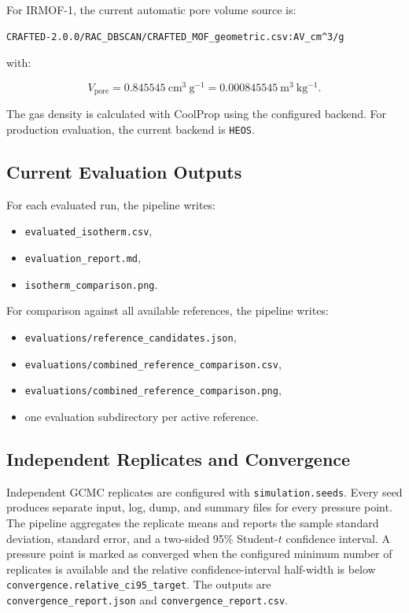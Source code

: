 For IRMOF-1, the current automatic pore volume source is:

\begin{lstlisting}
CRAFTED-2.0.0/RAC_DBSCAN/CRAFTED_MOF_geometric.csv:AV_cm^3/g
\end{lstlisting}

with:

\begin{equation}
    V_{\mathrm{pore}} = 0.845545~\mathrm{cm^3~g^{-1}}
    = 0.000845545~\mathrm{m^3~kg^{-1}}.
\end{equation}

The gas density is calculated with CoolProp using the configured backend.
For production evaluation, the current backend is \texttt{HEOS}.

\subsection{Current Evaluation Outputs}

For each evaluated run, the pipeline writes:

\begin{itemize}
    \item \texttt{evaluated\_isotherm.csv},
    \item \texttt{evaluation\_report.md},
    \item \texttt{isotherm\_comparison.png}.
\end{itemize}

For comparison against all available references, the pipeline writes:

\begin{itemize}
    \item \texttt{evaluations/reference\_candidates.json},
    \item \texttt{evaluations/combined\_reference\_comparison.csv},
    \item \texttt{evaluations/combined\_reference\_comparison.png},
    \item one evaluation subdirectory per active reference.
\end{itemize}

\subsection{Independent Replicates and Convergence}

Independent GCMC replicates are configured with \texttt{simulation.seeds}.
Every seed produces separate input, log, dump, and summary files for every pressure point.
The pipeline aggregates the replicate means and reports the sample standard deviation, standard error, and a two-sided 95\% Student-$t$ confidence interval.
A pressure point is marked as converged when the configured minimum number of replicates is available and the relative confidence-interval half-width is below \texttt{convergence.relative\_ci95\_target}.
The outputs are \texttt{convergence\_report.json} and \texttt{convergence\_report.csv}.

